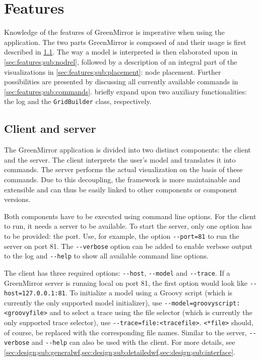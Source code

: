 \section{Features}\label{sec:features}
Knowledge of the features of GreenMirror is imperative when using the application. The two parts GreenMirror is composed of and their usage is first described in \cref{sec:features;sub:clientserver}. The way a model is interpreted is then elaborated upon in \cref{sec:features;sub:nodrel}, followed by a description of an integral part of the visualizations in \cref{sec:features;sub:placement}: node placement. Further possibilities are presented by discussing all currently available commands in \cref{sec:features;sub:commands}.  briefly expand upon two auxiliary functionalities: the log and the \lstinline{GridBuilder} class, respectively.
\subsection{Client and server}\label{sec:features;sub:clientserver}
The GreenMirror application is divided into two distinct components: the client and the server. The client interprets the user's model and translates it into commands. The server performs the actual visualization on the basis of these commands. Due to this decoupling, the framework is more maintainable and extensible and can thus be easily linked to other components or component versions.
\par Both components have to be executed using command line options. For the client to run, it needs a server to be available. To start the server, only one option has to be provided: the port. Use, for example, the option \lstinline{--port=81} to run the server on port 81. The \lstinline{--verbose} option can be added to enable verbose output to the log and \lstinline{--help} to show all available command line options.
\par The client has three required options: \lstinline{--host}, \lstinline{--model} and \lstinline{--trace}. If a GreenMirror server is running local on port 81, the first option would look like \lstinline{--host=127.0.0.1:81}. To initialize a model using a Groovy script (which is currently the only supported model initializer), use \lstinline{--model=groovyscript:<groovyfile>} and to select a trace using the file selector (which is currently the only supported trace selector), use \lstinline{--trace=file:<tracefile>}. \lstinline{<*file>} should, of course, be replaced with the corresponding file names. Similar to the server, \lstinline{--verbose} and \lstinline{--help} can also be used with the client. For more details, see \cref{sec:design;sub:generalwf,sec:design;sub:detailedwf,sec:design;sub:interface}.
